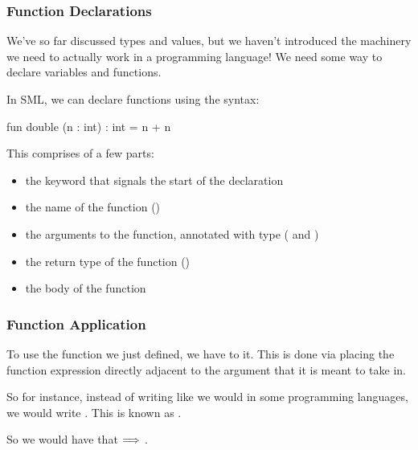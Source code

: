 \documentclass[aspectratio=169]{beamer}
\begin{document}
\begin{frame}[fragile]
  \frametitle{Function Declarations}

  We've so far discussed types and values, but we haven't introduced the machinery
  we need to actually work in a programming language! We need some way to declare
  variables and functions.

  \pause
  \vspace{\fill}

  In SML, we can declare functions using the  syntax:

  \vspace{5pt}

  \begin{codeblock}
    fun double (n : int) : int = n + n
  \end{codeblock}

  \pause
  \vspace{\fill}

  This comprises of a few parts:
  \begin{itemize}
    \item the  keyword that signals the start of the declaration
    \item the name of the function ()
    \item the arguments to the function, annotated with type ( and )
    \item the return type of the function ()
    \item the body of the function 
  \end{itemize}
\end{frame}

\begin{frame}[fragile]
  \frametitle{Function Application}

  To use the function we just defined, we have to  it. This is done via
  placing the function expression directly adjacent to the argument that it is meant 
  to take in. 

  \pause
  \vspace{\fill}
  
  So for instance, instead of writing  like we would in some programming
  languages, we would write . This is known as .

  \pause
  \vspace{\fill}

  So we would have that  $\Longrightarrow$ .
\end{frame}
\end{document}
